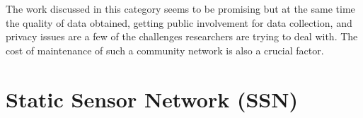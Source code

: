 The work discussed in this category seems to be promising but at the same time the quality of data obtained, getting public involvement for data collection, and privacy issues \cite{Yi2015} are a few of the challenges researchers are trying to deal with. The cost of maintenance of such a community network is also a crucial factor.






\section{Static Sensor Network (SSN)}

